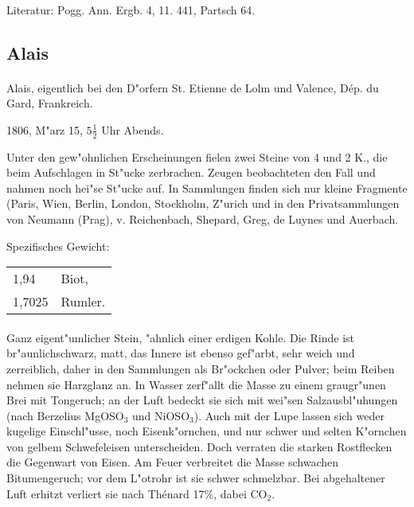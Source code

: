 \documentclass[a4paper, 11pt, oneside]{article}
\begin{document}
\paragraph{}
Literatur: Pogg. Ann. Ergb. 4, 11. 441, Partsch 64.
\subsection{Alais}
\normalsize
\paragraph{}
Alais, eigentlich bei den D"orfern St. Etienne de Lolm und Valence, Dép. du Gard, Frankreich.

1806, M"arz 15, $5\frac{1}{2}$ Uhr Abends.

Unter den gew"ohnlichen Erscheinungen fielen zwei Steine von 4 und 2 K., die beim Aufschlagen in St"ucke zerbrachen. Zeugen beobachteten den Fall und nahmen noch hei"se St"ucke auf. In Sammlungen finden sich nur kleine Fragmente (Paris, Wien, Berlin, London, Stockholm, Z"urich und in den Privatsammlungen von Neumann (Prag), v. Reichenbach, Shepard, Greg, de Luynes und Auerbach.

Spezifisches Gewicht:
\begin{table}[!ht]
    \centering
    \begin{tabular}{l l}
        1,94 & Biot,\\
        1,7025 & Rumler.
    \end{tabular}
\end{table}
\paragraph{}
Ganz eigent"umlicher Stein, "ahnlich einer erdigen Kohle. Die Rinde ist br"aunlichschwarz, matt, das Innere ist ebenso gef"arbt, sehr weich und zerreiblich, daher in den Sammlungen als Br"ockchen oder Pulver; beim Reiben nehmen sie Harzglanz an. In Wasser zerf"allt die Masse zu einem graugr"unen Brei mit Tongeruch; an der Luft bedeckt sie sich mit wei"sen Salzausbl"uhungen (nach Berzelius MgOSO$_{3}$ und NiOSO$_{3}$). Auch mit der Lupe lassen sich weder kugelige Einschl"usse, noch Eisenk"ornchen, und nur schwer und selten K"ornchen von gelbem Schwefeleisen unterscheiden. Doch verraten die starken Rostflecken die Gegenwart von Eisen. Am Feuer verbreitet die Masse schwachen Bitumengeruch; vor dem L"otrohr ist sie schwer schmelzbar. Bei abgehaltener Luft erhitzt verliert sie nach Thénard 17\%, dabei CO$_{2}$.
\end{document}
